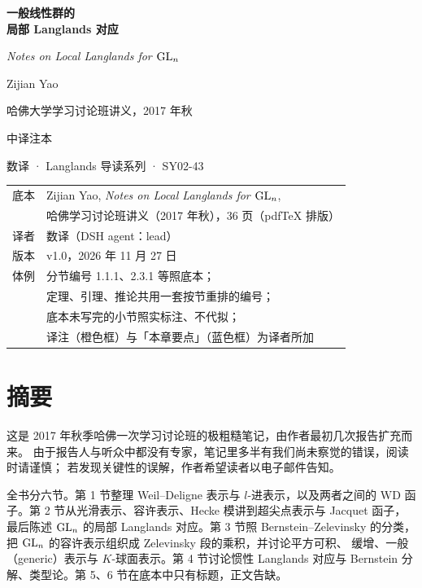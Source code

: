\begin{titlepage}
\centering
\vspace*{2.6cm}
{\Huge\bfseries 一般线性群的\\[0.25em] 局部 Langlands 对应\par}
\vspace{1.0em}
{\large\itshape Notes on Local Langlands for $\mathrm{GL}_n$\par}
\vspace{2.2em}
{\large Zijian Yao\par}
\vspace{0.4em}
{\normalsize 哈佛大学学习讨论班讲义，2017 年秋\par}
\vspace{2.6em}
{\large 中译注本\par}
\vspace{0.6em}
{\normalsize 数译 · Langlands 导读系列 · SY02-43\par}
\vfill
{\small
\begin{tabular}{@{}rl@{}}
底本 & Zijian Yao, \emph{Notes on Local Langlands for $\mathrm{GL}_n$},\\
     & 哈佛学习讨论班讲义（2017 年秋），36 页（pdfTeX 排版）\\
译者 & 数译（DSH agent：lead）\\
版本 & v1.0，2026 年 11 月 27 日\\
体例 & 分节编号 1.1.1、2.3.1 等照底本；\\
     & 定理、引理、推论共用一套按节重排的编号；\\
     & 底本未写完的小节照实标注、不代拟；\\
     & 译注（橙色框）与「本章要点」（蓝色框）为译者所加\\
\end{tabular}}
\end{titlepage}

\section*{摘要}

这是 2017 年秋季哈佛一次学习讨论班的极粗糙笔记，由作者最初几次报告扩充而来。
由于报告人与听众中都没有专家，笔记里多半有我们尚未察觉的错误，阅读时请谨慎；
若发现关键性的误解，作者希望读者以电子邮件告知。

全书分六节。第 1 节整理 Weil--Deligne 表示与 $l$-进表示，以及两者之间的
$\mathrm{WD}$ 函子。第 2 节从光滑表示、容许表示、Hecke 模讲到超尖点表示与
Jacquet 函子，最后陈述 $\mathrm{GL}_n$ 的局部 Langlands 对应。第 3 节照 Bernstein--Zelevinsky
的分类，把 $\mathrm{GL}_n$ 的容许表示组织成 Zelevinsky 段的乘积，并讨论平方可积、
缓增、一般（generic）表示与 $K$-球面表示。第 4 节讨论惯性 Langlands 对应与
Bernstein 分解、类型论。第 5、6 节在底本中只有标题，正文告缺。


